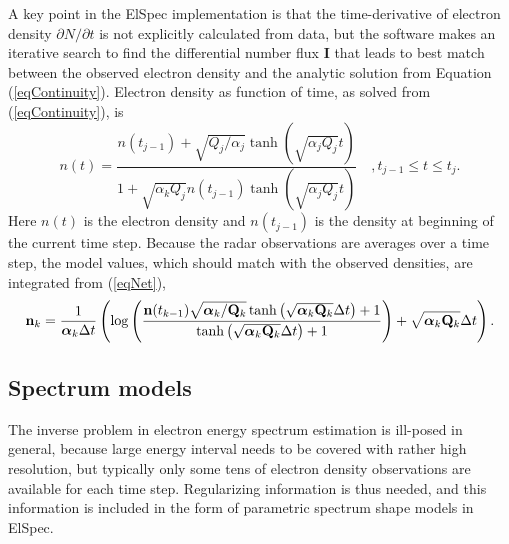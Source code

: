 \documentclass[12pt,a4paper]{report}
\begin{document}
A key point in the ElSpec implementation is that the time-derivative of electron density $\partial N / \partial t$ is not explicitly calculated from data, but the software makes an iterative search to find the differential number flux $\bm{I}$ that leads to best match between the observed electron density and the analytic solution from Equation (\ref{eqContinuity}). Electron density as function of time, as solved from (\ref{eqContinuity}), is
\begin{equation}
n(t) = \frac{ n(t_{j-1}) + \sqrt{Q_j/ \alpha_j}\tanh\left(\sqrt{\alpha_j Q_j} t\right) }{ 1 + \sqrt{\alpha_kQ_j}n(t_{j-1})\tanh\left(\sqrt{\alpha_j Q_j} t\right)} \quad, t_{j-1}\leq t \leq t_{j}.
\label{eqNet}
\end{equation}
Here $n(t)$ is the electron density and $n(t_{j-1})$ is the density at beginning of the current time step. Because the radar observations are averages over a time step, the model values, which should match with the observed densities, are integrated from (\ref{eqNet}),
\begin{equation}
\mathbf{n}_k=
\frac{1}{\mbox{\boldmath{$\alpha$}}_k \Delta t}
\left(
\log\left(
\frac{\mathbf{n}(t_{k-1})\sqrt{\mbox{\boldmath{$\alpha$}}_k/\mathbf{Q}_k}\tanh\left(\sqrt{\mbox{\boldmath{$\alpha$}}_k\mathbf{Q}_k}\Delta t\right)+1}{\tanh\left(\sqrt{\mbox{\boldmath{$\alpha$}}_k\mathbf{Q}_k}\Delta t\right) + 1}
\right)
+\sqrt{\mbox{\boldmath{$\alpha$}}_k\mathbf{Q}_k}\Delta t
\right).
\label{eqDirthe}
\end{equation}


\subsection{Spectrum models}

The inverse problem in electron energy spectrum estimation is ill-posed in general, because large energy interval needs to be covered with rather high resolution, but typically only some tens of electron density observations are available for each time step. Regularizing information is thus needed, and this information is included in the form of parametric spectrum shape models in ElSpec. 
\end{document}
